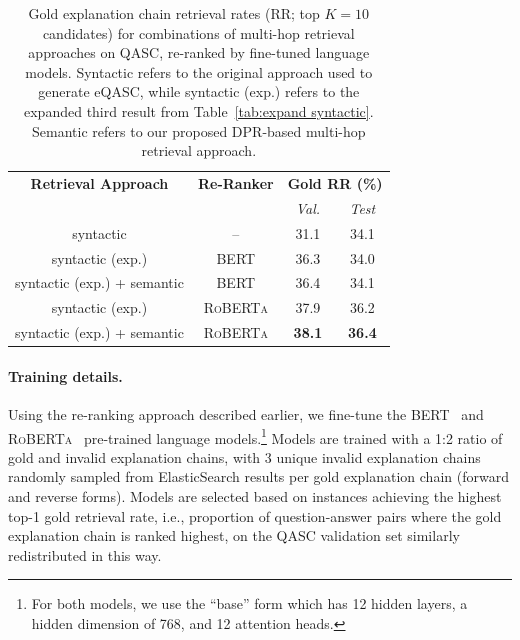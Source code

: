 \documentclass[letterpaper]{article} %
\begin{document}
\begin{table}
    \centering
    \footnotesize
    \begin{tabular}{c|c|cc}
    \toprule
        \textbf{Retrieval Approach}  & \textbf{Re-Ranker} &\multicolumn{2}{c}{\textbf{Gold RR (\%)}} \\
         & & \textit{Val.} & \textit{Test} \\\midrule
        syntactic & -- & 31.1 & 34.1 \\\midrule
        syntactic (exp.) & \textsc{BERT} & 36.3 & 34.0 \\
        syntactic (exp.) + semantic & \textsc{BERT} & {36.4} & {34.1} \\\midrule
        syntactic (exp.) & \textsc{RoBERTa} & 37.9 & 36.2 \\
        syntactic (exp.) + semantic & \textsc{RoBERTa} & \textbf{38.1} & \textbf{36.4} \\        
        \bottomrule
    \end{tabular}
    \normalsize
    \caption{Gold explanation chain retrieval rates (RR; top $K=10$ candidates) for combinations of multi-hop retrieval approaches on QASC, re-ranked by fine-tuned language models. Syntactic refers to the original approach used to generate eQASC, while syntactic (exp.) refers to the expanded third result from Table~\ref{tab:expand syntactic}. Semantic refers to our proposed DPR-based multi-hop retrieval approach.}
    \vspace{-1em}
    \label{tab:reranking}
\end{table}

\paragraph{Training details.}
Using the re-ranking approach described earlier, we fine-tune the \textsc{BERT}~\cite{devlin-etal-2019-bert} and \textsc{RoBERTa}~\cite{liu2019roberta} %
pre-trained language models.\footnote{For both models, we use the ``base'' form which has 12 hidden layers, a hidden dimension of 768, and 12 attention heads.} Models are trained with a 1:2 ratio of gold and invalid explanation chains, with 3 unique invalid explanation chains randomly sampled from ElasticSearch results per gold explanation chain (forward and reverse forms). Models are selected based on instances achieving the highest top-1 gold retrieval rate, i.e., proportion of question-answer pairs where the gold explanation chain is ranked highest, on the QASC validation set similarly redistributed in this way. 
\end{document}
